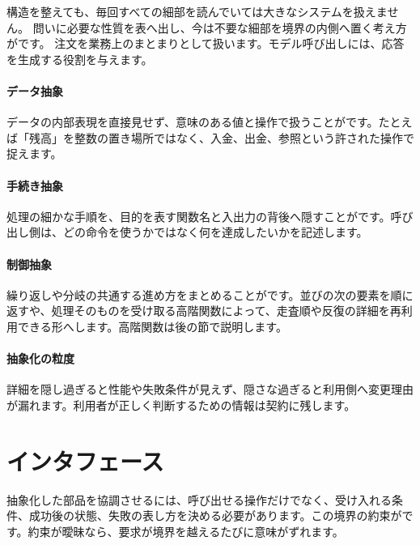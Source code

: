 構造を整えても、毎回すべての細部を読んでいては大きなシステムを扱えません。
問いに必要な性質を表へ出し、今は不要な細部を境界の内側へ置く考え方がです。
注文を業務上のまとまりとして扱います。モデル呼び出しには、応答を生成する役割を与えます。

\begingroup
\begingroup
\paragraph{データ抽象}
        データの内部表現を直接見せず、意味のある値と操作で扱うことがです。たとえば「残高」を整数の置き場所ではなく、入金、出金、参照という許された操作で捉えます。

\par
\endgroup
\medskip
\begingroup
\paragraph{手続き抽象}
        処理の細かな手順を、目的を表す関数名と入出力の背後へ隠すことがです。呼び出し側は、どの命令を使うかではなく何を達成したいかを記述します。

\par
\endgroup
\medskip
\begingroup
\paragraph{制御抽象}
        繰り返しや分岐の共通する進め方をまとめることがです。並びの次の要素を順に返すや、処理そのものを受け取る高階関数によって、走査順や反復の詳細を再利用できる形へします。高階関数は後の節で説明します。

\par
\endgroup
  \vspace{5mm}
\paragraph{抽象化の粒度}
    詳細を隠し過ぎると性能や失敗条件が見えず、隠さな過ぎると利用側へ変更理由が漏れます。利用者が正しく判断するための情報は契約に残します。

\par
\endgroup


\section{インタフェース}
\label{sec:04-software-engineering-08}

抽象化した部品を協調させるには、呼び出せる操作だけでなく、受け入れる条件、成功後の状態、失敗の表し方を決める必要があります。この境界の約束がです。約束が曖昧なら、要求が境界を越えるたびに意味がずれます。

